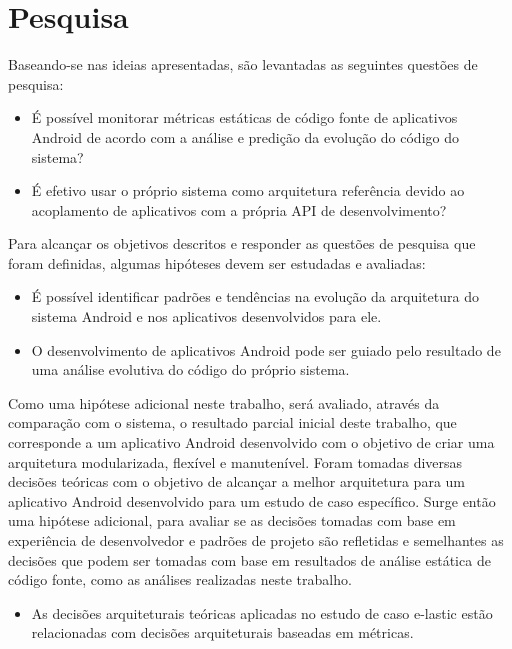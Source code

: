 \section{Pesquisa}

Baseando-se nas ideias apresentadas, são levantadas as seguintes questões de pesquisa:

\begin{itemize}
\item É possível monitorar métricas estáticas de código fonte de aplicativos Android de acordo com a análise e predição da evolução do código do sistema?
\item É efetivo usar o próprio sistema como arquitetura referência devido ao acoplamento de aplicativos com a própria API de desenvolvimento?
\end{itemize}

Para alcançar os objetivos descritos e responder as questões de pesquisa que foram definidas, algumas hipóteses devem ser estudadas e avaliadas:

\begin{itemize}
\item É possível identificar padrões e tendências na evolução da arquitetura do sistema Android e nos aplicativos desenvolvidos para ele.
\item O desenvolvimento de aplicativos Android pode ser guiado pelo resultado de uma análise evolutiva do código do próprio sistema.
\end{itemize}

Como uma hipótese adicional neste trabalho, será avaliado, através da comparação com o sistema, o resultado parcial inicial deste trabalho, que corresponde a um aplicativo Android desenvolvido com o objetivo de criar uma arquitetura modularizada, flexível e manutenível. Foram tomadas diversas decisões teóricas com o objetivo de alcançar a melhor arquitetura para um aplicativo Android desenvolvido para um estudo de caso específico. Surge então uma hipótese adicional, para avaliar se as decisões tomadas com base em experiência de desenvolvedor e padrões de projeto são refletidas e semelhantes as decisões que podem ser tomadas com base em resultados de análise estática de código fonte, como as análises realizadas neste trabalho.

\begin{itemize}
\item As decisões arquiteturais teóricas aplicadas no estudo de caso e-lastic estão relacionadas com decisões arquiteturais baseadas em métricas.
\end{itemize}

